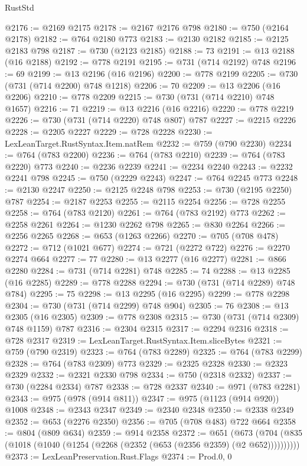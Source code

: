 \begin{lexlean}{RustStd}
\begin{coremodule}
@2176 := @2169 @2175
@2178 := @2167 @2176 @798
@2180 := @750 (@2164 @2178)
@2182 := @764 @2180 @773
@2183 := @2130 @2182
@2185 := @2125 @2183 @798
@2187 := @730 (@2123 @2185)
@2188 := 73
@2191 := @13 @2188 (@16 @2188)
@2192 := @778 @2191
@2195 := @731 (@714 @2192) @748
@2196 := 69
@2199 := @13 @2196 (@16 @2196)
@2200 := @778 @2199
@2205 := @730 (@731 (@714 @2200) @748 @1218)
@2206 := 70
@2209 := @13 @2206 (@16 @2206)
@2210 := @778 @2209
@2215 := @730 (@731 (@714 @2210) @748 @1657)
@2216 := 71
@2219 := @13 @2216 (@16 @2216)
@2220 := @778 @2219
@2226 := @730 (@731 (@714 @2220) @748 @807) @787
@2227 := @2215 @2226
@2228 := @2205 @2227
@2229 := @728 @2228
@2230 := LexLeanTarget.RustSyntax.Item.natRem
@2232 := @759 (@790 @2230)
@2234 := @764 (@783 @2200)
@2236 := @764 (@783 @2210)
@2239 := @764 (@783 @2220) @773
@2240 := @2236 @2239
@2241 := @2234 @2240
@2243 := @2232 @2241 @798
@2245 := @750 (@2229 @2243)
@2247 := @764 @2245 @773
@2248 := @2130 @2247
@2250 := @2125 @2248 @798
@2253 := @730 (@2195 @2250) @787
@2254 := @2187 @2253
@2255 := @2115 @2254
@2256 := @728 @2255
@2258 := @764 (@783 @2120)
@2261 := @764 (@783 @2192) @773
@2262 := @2258 @2261
@2264 := @1230 @2262 @798
@2265 := @830 @2264
@2266 := @2256 @2265
@2268 := @653 (@1263 @2266)
@2270 := @705 (@708 @478)
@2272 := @712 (@1021 @677)
@2274 := @721 (@2272 @722)
@2276 := @2270 @2274 @664
@2277 := 77
@2280 := @13 @2277 (@16 @2277)
@2281 := @866 @2280
@2284 := @731 (@714 @2281) @748
@2285 := 74
@2288 := @13 @2285 (@16 @2285)
@2289 := @778 @2288
@2294 := @730 (@731 (@714 @2289) @748 @784)
@2295 := 75
@2298 := @13 @2295 (@16 @2295)
@2299 := @778 @2298
@2304 := @730 (@731 (@714 @2299) @748 @904)
@2305 := 76
@2308 := @13 @2305 (@16 @2305)
@2309 := @778 @2308
@2315 := @730 (@731 (@714 @2309) @748 @1159) @787
@2316 := @2304 @2315
@2317 := @2294 @2316
@2318 := @728 @2317
@2319 := LexLeanTarget.RustSyntax.Item.sliceBytes
@2321 := @759 (@790 @2319)
@2323 := @764 (@783 @2289)
@2325 := @764 (@783 @2299)
@2328 := @764 (@783 @2309) @773
@2329 := @2325 @2328
@2330 := @2323 @2329
@2332 := @2321 @2330 @798
@2334 := @750 (@2318 @2332)
@2337 := @730 (@2284 @2334) @787
@2338 := @728 @2337
@2340 := @971 (@783 @2281)
@2343 := @975 (@978 (@914 @811))
@2347 := @975 (@1123 (@914 @920)) @1008
@2348 := @2343 @2347
@2349 := @2340 @2348
@2350 := @2338 @2349
@2352 := @653 (@2276 @2350)
@2356 := @705 (@708 @483) @722 @664
@2358 := @804 (@809 @634)
@2359 := @914 @2358
@2372 := @651
    (@673 (@704 (@835 (@1018 (@1040 (@1254 (@2268 (@2352 (@653 (@2356 @2359) (@2 @652))))))))))
@2373 := LexLeanPreservation.Rust.Flags
@2374 := Prod.{0, 0}

\end{coremodule}
\end{lexlean}
